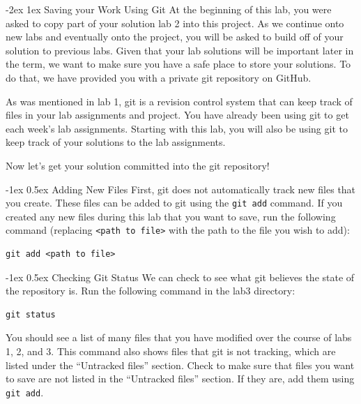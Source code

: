 \documentclass[11pt]{article}
\makeatletter
\renewcommand{\section}
{\@startsection {section}{1}{0pt}
 {-2ex}
 {1ex}
 {\bfseries\Large}}
\renewcommand{\subsection}
{\@startsection {subsection}{1}{0pt}
 {-1ex}
 {0.5ex}
 {\bfseries\normalsize}}
\makeatother
\begin{document}

\section{Saving your Work Using Git}
At the beginning of this lab, you were asked to copy part of your solution lab 2 into this project.  As we continue onto new labs and eventually onto the project, you will be asked to build off of your solution to previous labs.  Given that your lab solutions will be important later in the term, we want to make sure you have a safe place to store your solutions.  To do that, we have provided you with a private git repository on GitHub.

As was mentioned in lab 1, git is a revision control system that can keep track of files in your lab assignments and project.  You have already been using git to get each week's lab assignments.  Starting with this lab, you will also be using git to keep track of your solutions to the lab assignments.

Now let's get your solution committed into the git repository!

\subsection{Adding New Files}
First, git does not automatically track new files that you create.  These files can be added to git using the \verb|git add| command.  If you created any new files during this lab that you want to save, run the following command (replacing \verb|<path to file>| with the path to the file you wish to add):
\begin{verbatim}
git add <path to file>
\end{verbatim}

\subsection{Checking Git Status}
We can check to see what git believes the state of the repository is.  Run the following command in the lab3 directory:
\begin{verbatim}
git status
\end{verbatim}
You should see a list of many files that you have modified over the course of labs 1, 2, and 3.  This command also shows files that git is not tracking, which are listed under the ``Untracked files'' section.  Check to make sure that files you want to save are not listed in the ``Untracked files'' section.  If they are, add them using \verb|git add|.
\end{document}

